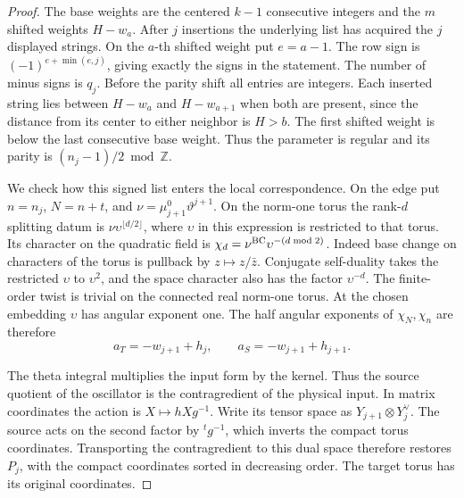 \documentclass[a4paper,11pt]{article}
\theoremstyle{definition}
\theoremstyle{remark}
\newcommand{\ZZ}{\mathbb Z}\newcommand{\ord}{\operatorname{ord}}
\numberwithin{equation}{section}
\begin{document}
\begin{proof}
The base weights are the centered \(k-1\) consecutive integers and
the \(m\) shifted weights \(H-w_a\). After \(j\) insertions the
underlying list has acquired the \(j\) displayed strings.
On the \(a\)-th shifted weight put \(e=a-1\). The row sign is
\((-1)^{e+\min(e,j)}\), giving exactly the signs in the statement.
The number of minus signs is \(q_j\). Before the parity shift all
entries are integers. Each inserted string lies between \(H-w_a\)
and \(H-w_{a+1}\) when both are present, since the distance from
its center to either neighbor is \(H>b\). The first shifted weight
is below the last consecutive base weight. Thus the parameter is
regular and its parity is \((n_j-1)/2\bmod\ZZ\).

We check how this signed list enters the local correspondence.
On the edge put \(n=n_j\), \(N=n+t\), and
\(\nu=\mu^0_{j+1}\vartheta^{j+1}\). On the norm-one torus the
rank-\(d\) splitting datum is \(\nu\upsilon^{\lfloor d/2\rfloor}\),
where \(\upsilon\) in this expression is restricted to that torus.
Its character on the quadratic field is
\(\chi_d=\nu^{\rm BC}\upsilon^{-(d\bmod 2)}\).
Indeed base change on characters of the torus is pullback by
\(z\mapsto z/\bar z\). Conjugate self-duality takes the restricted
\(\upsilon\) to \(\upsilon^2\), and the space character also has
the factor \(\upsilon^{-d}\). The finite-order twist is trivial
on the connected real norm-one torus. At the chosen embedding
\(\upsilon\) has angular exponent one. The half angular exponents
of \(\chi_N,\chi_n\) are therefore
\[
              a_T=-w_{j+1}+h_j,\qquad
              a_S=-w_{j+1}+h_{j+1}.
\]

The theta integral multiplies the input form by the kernel.
Thus the source quotient of the oscillator is the
contragredient of the physical input. In matrix coordinates the
action is \(X\mapsto hXg^{-1}\). Write its tensor space as
\(Y_{j+1}\otimes Y_j^\vee\). The source acts on the second factor by
\({}^t g^{-1}\), which inverts the compact torus coordinates.
Transporting the contragredient to this dual space therefore
restores \(P_j\), with the compact coordinates sorted in decreasing
order. The target torus has its original coordinates.


\end{proof}
\end{document}
